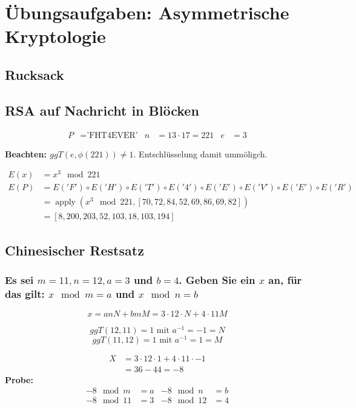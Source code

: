 \section{Übungsaufgaben: Asymmetrische Kryptologie}
\subsection{Rucksack}
\subsection{RSA auf Nachricht in Blöcken}


\begin{align}
  P &= \text{'FHT4EVER'}  &
  n &= 13 \cdot 17 = 221 & e &= 3
\end{align}

\textbf{Beachten: $ggT(e, \phi(221) ) \ne 1$}. Entschlüsselung damit ummöligch.

\begin{align}
	E(x) &=  x^3 \mod 221 \\
	E(P) &=  E('F') \circ E('H')\circ E('T')\circ E('4')\circ E('E')\circ E('V')\circ E('E')\circ E('R')\\
		 &=  \operatorname{apply}(x^3 \mod 221 ,[70, 72, 84, 52, 69, 86, 69, 82])    \\
		 &=  [8, 200, 203, 52, 103, 18, 103, 194]
\end{align}


\subsection{Chinesischer Restsatz}
\subsubsection{Es sei $m = 11, n = 12, a = 3$ und $b = 4$. Geben Sie ein $x$ an, für das gilt: $x \mod m = a$ und $ x \mod n = b$}

\begin{equation}
	x = a n N + b m M  = 3 \cdot 12 \cdot N + 4 \cdot 11 M
\end{equation}

$$ggT(12, 11) = 1 \text{ mit } a^{-1} = -1 = N$$
$$ggT(11, 12) = 1 \text{ mit } a^{-1} =  1 = M$$

\begin{align}
	X &= 3 \cdot 12 \cdot 1 + 4 \cdot 11 \cdot -1 \\
	  &=  36 - 44 = -8
\end{align}
\textbf{Probe:}
\begin{align}
	-8 \mod  m &= a  & -8 \mod  n &= b \\
	-8 \mod 11 &= 3  & -8 \mod 12 &= 4 \\
\end{align}

